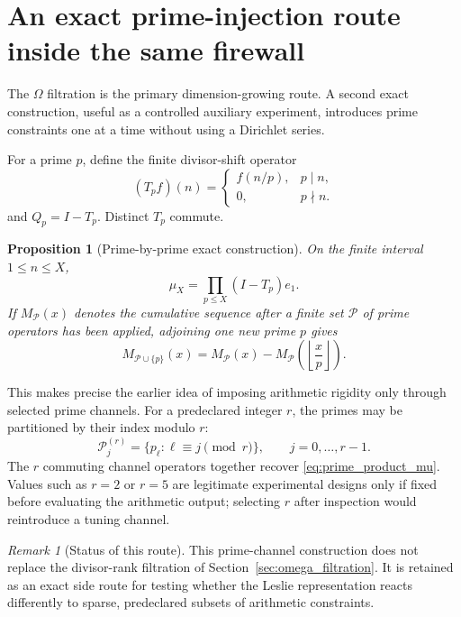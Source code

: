 \documentclass[11pt]{amsart}
\numberwithin{equation}{section}
\theoremstyle{plain}
\newtheorem{proposition}[theorem]{Proposition}
\theoremstyle{definition}
\theoremstyle{remark}
\newtheorem{remark}[theorem]{Remark}
\begin{document}
\section{An exact prime-injection route inside the same firewall}
\label{sec:prime_injection_route}

The $\Omega$ filtration is the primary dimension-growing route.  A second exact construction,
useful as a controlled auxiliary experiment, introduces prime constraints one at a time without
using a Dirichlet series.

For a prime $p$, define the finite divisor-shift operator
\begin{equation}
(T_pf)(n)
=
\begin{cases}
f(n/p),&p\mid n,\\
0,&p\nmid n.
\end{cases}
\label{eq:Tp}
\end{equation}
and $Q_p=I-T_p$.  Distinct $T_p$ commute.

\begin{proposition}[Prime-by-prime exact construction]
\label{prop:prime_by_prime_mu}
On the finite interval $1\le n\le X$,
\begin{equation}
\mu_X
=
\prod_{p\le X}(I-T_p)e_1.
\label{eq:prime_product_mu}
\end{equation}
If $M_{\mathcal P}(x)$ denotes the cumulative sequence after a finite set
$\mathcal P$ of prime operators has been applied, adjoining one new prime $p$ gives
\begin{equation}
M_{\mathcal P\cup\{p\}}(x)
=
M_{\mathcal P}(x)
-
M_{\mathcal P}
\left(\left\lfloor\frac xp\right\rfloor\right).
\label{eq:prime_floor_update}
\end{equation}
\end{proposition}

This makes precise the earlier idea of imposing arithmetic rigidity only through selected prime
channels.  For a predeclared integer $r$, the primes may be partitioned by their index modulo
$r$:
\[
\mathcal P_j^{(r)}=
\{p_\ell:\ell\equiv j\pmod r\},
\qquad
j=0,\ldots,r-1.
\]
The $r$ commuting channel operators together recover
\eqref{eq:prime_product_mu}.  Values such as $r=2$ or $r=5$ are legitimate experimental
designs only if fixed before evaluating the arithmetic output; selecting $r$ after inspection
would reintroduce a tuning channel.

\begin{remark}[Status of this route]
\label{rem:prime_route_status}
This prime-channel construction does not replace the divisor-rank filtration of
Section~\ref{sec:omega_filtration}.  It is retained as an exact side route for testing whether
the Leslie representation reacts differently to sparse, predeclared subsets of arithmetic
constraints.
\end{remark}
\end{document}
